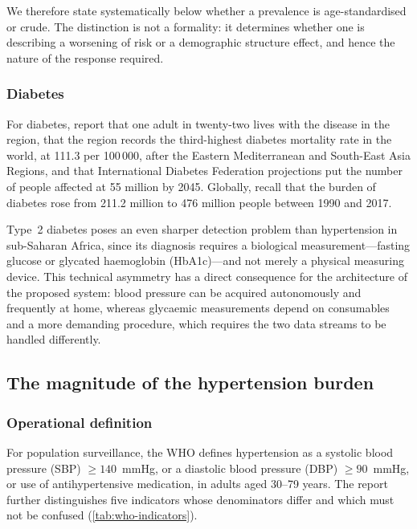 \documentclass[12pt,a4paper,oneside]{report}
\begin{document}
We therefore state systematically below whether a prevalence is age-standardised or crude. The distinction is not a formality: it determines whether one is describing a worsening of risk or a demographic structure effect, and hence the nature of the response required.

\subsubsection{Diabetes}

For diabetes, \textcite{nagavci2022} report that one adult in twenty-two lives with the disease in the region, that the region records the third-highest diabetes mortality rate in the world, at 111.3 per 100\,000, after the Eastern Mediterranean and South-East Asia Regions, and that International Diabetes Federation projections put the number of people affected at 55 million by 2045. Globally, \textcite{hinneh2023} recall that the burden of diabetes rose from 211.2 million to 476 million people between 1990 and 2017.

Type~2 diabetes poses an even sharper detection problem than hypertension in sub-Saharan Africa, since its diagnosis requires a biological measurement---fasting glucose or glycated haemoglobin (HbA1c)---and not merely a physical measuring device. This technical asymmetry has a direct consequence for the architecture of the proposed system: blood pressure can be acquired autonomously and frequently at home, whereas glycaemic measurements depend on consumables and a more demanding procedure, which requires the two data streams to be handled differently.

\subsection{The magnitude of the hypertension burden}\label{sec:hta-burden}

\subsubsection{Operational definition}

For population surveillance, the WHO defines hypertension as a systolic blood pressure (SBP) $\geq 140$~mmHg, or a diastolic blood pressure (DBP) $\geq 90$~mmHg, or use of antihypertensive medication, in adults aged 30--79 years. The report further distinguishes five indicators whose denominators differ and which must not be confused (\cref{tab:who-indicators}).
\end{document}
